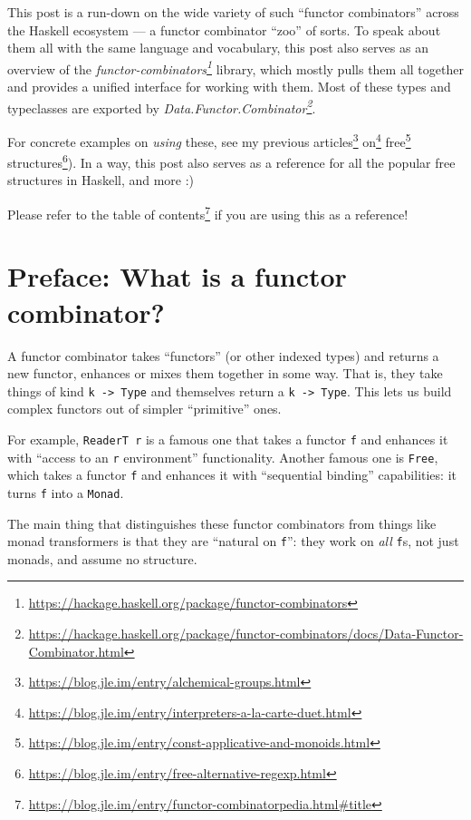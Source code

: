 \documentclass[]{article}
\renewcommand{\href}[2]{#2\footnote{\url{#1}}}
\begin{document}
This post is a run-down on the wide variety of such ``functor combinators''
across the Haskell ecosystem --- a functor combinator ``zoo'' of sorts. To speak
about them all with the same language and vocabulary, this post also serves as
an overview of the
\emph{\href{https://hackage.haskell.org/package/functor-combinators}{functor-combinators}}
library, which mostly pulls them all together and provides a unified interface
for working with them. Most of these types and typeclasses are exported by
\emph{\href{https://hackage.haskell.org/package/functor-combinators/docs/Data-Functor-Combinator.html}{Data.Functor.Combinator}}.

For concrete examples on \emph{using} these, see my previous
\href{https://blog.jle.im/entry/alchemical-groups.html}{articles}
\href{https://blog.jle.im/entry/interpreters-a-la-carte-duet.html}{on}
\href{https://blog.jle.im/entry/const-applicative-and-monoids.html}{free}
\href{https://blog.jle.im/entry/free-alternative-regexp.html}{structures}). In a
way, this post also serves as a reference for all the popular free structures in
Haskell, and more :)

Please refer to the
\href{https://blog.jle.im/entry/functor-combinatorpedia.html\#title}{table of
contents} if you are using this as a reference!

\hypertarget{preface-what-is-a-functor-combinator}{%
\section{Preface: What is a functor
combinator?}\label{preface-what-is-a-functor-combinator}}

A functor combinator takes ``functors'' (or other indexed types) and returns a
new functor, enhances or mixes them together in some way. That is, they take
things of kind \texttt{k\ -\textgreater{}\ Type} and themselves return a
\texttt{k\ -\textgreater{}\ Type}. This lets us build complex functors out of
simpler ``primitive'' ones.

For example, \texttt{ReaderT\ r} is a famous one that takes a functor \texttt{f}
and enhances it with ``access to an \texttt{r} environment'' functionality.
Another famous one is \texttt{Free}, which takes a functor \texttt{f} and
enhances it with ``sequential binding'' capabilities: it turns \texttt{f} into a
\texttt{Monad}.

The main thing that distinguishes these functor combinators from things like
monad transformers is that they are ``natural on \texttt{f}'': they work on
\emph{all} \texttt{f}s, not just monads, and assume no structure.
\end{document}
